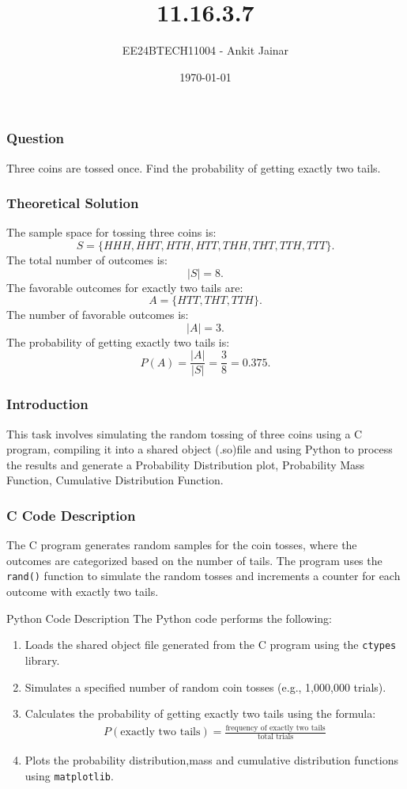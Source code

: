 \documentclass{beamer}
\title{11.16.3.7}
\author{EE24BTECH11004 - Ankit Jainar}
\date{\today}
\begin{document}
\frame{\titlepage}

\begin{frame}
\frametitle{Question}
Three coins are tossed once. Find the probability of getting exactly two tails.
\end{frame}
\begin{frame}
\frametitle{Theoretical Solution}
The sample space for tossing three coins is:
\[
S = \{HHH, HHT, HTH, HTT, THH, THT, TTH, TTT\}.
\]
The total number of outcomes is:
\[
|S| = 8.
\]
The favorable outcomes for exactly two tails are:
\[
A = \{HTT, THT, TTH\}.
\]
The number of favorable outcomes is:
\[
|A| = 3.
\]
The probability of getting exactly two tails is:
\[
P(A) = \frac{|A|}{|S|} = \frac{3}{8} = 0.375.
\]
\end{frame}

\begin{frame}
\frametitle{Introduction}
This task involves simulating the random tossing of three coins using a C program, compiling it into a shared object (.so)file and using Python to process the results and generate a Probability Distribution plot, Probability Mass Function, Cumulative Distribution Function.
\end{frame}
\begin{frame}
\frametitle{C Code Description}
The C program generates random samples for the coin tosses, where the outcomes are categorized based on the number of tails. The program uses the \texttt{rand()} function to simulate the random tosses and increments a counter for each outcome with exactly two tails.
\end{frame}
\begin{frame}{Python Code Description}
    The Python code performs the following:
\begin{enumerate}
    \item Loads the shared object file generated from the C program using the \texttt{ctypes} library.
    \item Simulates a specified number of random coin tosses (e.g., 1,000,000 trials).
    \item Calculates the probability of getting exactly two tails using the formula:
    \begin{align}
    P(\text{exactly two tails}) = \frac{\text{frequency of exactly two tails}}{\text{total trials}}
    \end{align}
    \item Plots the probability distribution,mass and cumulative distribution functions using \texttt{matplotlib}.
\end{enumerate}

\end{frame}
\end{document}
